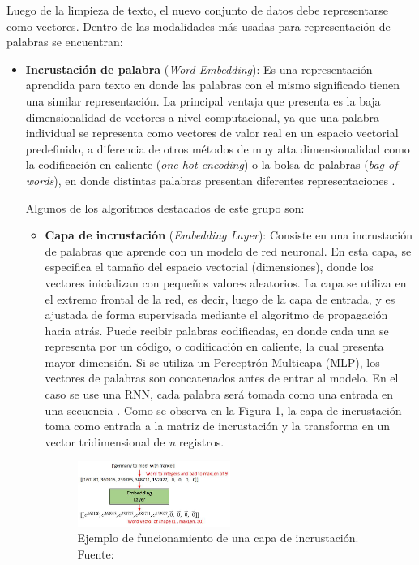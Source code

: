 Luego de la limpieza de texto, el nuevo conjunto de datos debe representarse como vectores. Dentro de las modalidades más usadas para representación de palabras se encuentran:
\begin{itemize}
	\item \textbf{Incrustación de palabra} (\textit{Word Embedding}): Es una representación aprendida para texto en donde las palabras con el mismo significado tienen una similar representación. La principal ventaja que presenta es la baja dimensionalidad de vectores a nivel computacional, ya que una palabra individual se representa como vectores de valor real en un espacio vectorial predefinido, a diferencia de otros métodos de muy alta dimensionalidad como la codificación en caliente (\textit{one hot encoding}) o la bolsa de palabras (\textit{bag-of-words}), en donde distintas palabras presentan diferentes representaciones \parencite{bk_brownlee2017deeplearning_nlp}.
	
	Algunos de los algoritmos destacados de este grupo son:
	\begin{itemize}
		\item \textbf{Capa de incrustación} (\textit{Embedding Layer}): Consiste en una incrustación de palabras que aprende con un modelo de red neuronal. En esta capa, se especifica el tamaño del espacio vectorial (dimensiones), donde los vectores inicializan con pequeños valores aleatorios. La capa se utiliza en el extremo frontal de la red, es decir, luego de la capa de entrada, y es ajustada de forma supervisada mediante el algoritmo de propagación hacia atrás. Puede recibir palabras codificadas, en donde cada una se representa por un código, o codificación en caliente, la cual presenta mayor dimensión. Si se utiliza un Perceptrón Multicapa (MLP), los vectores de palabras son concatenados antes de entrar al modelo. En el caso se use una RNN, cada palabra será tomada como una entrada en una secuencia \parencite{bk_brownlee2017deeplearning_nlp}. Como se observa en la Figura \ref{2:fig47}, la capa de incrustación toma como entrada a la matriz de incrustación y la transforma en un vector tridimensional de \textit{n} registros.
		
		\begin{figure}[!ht]
			\begin{center}
				\includegraphics[width=0.50\textwidth]{2/figures/embedding_layer.jpg}
				\caption[Ejemplo de funcionamiento de una capa de incrustación]{Ejemplo de funcionamiento de una capa de incrustación.\\
				Fuente: \cite{tec_chengwei2018embedding}}
				\label{2:fig47}
			\end{center}
		\end{figure}
		

\end{itemize}
\end{itemize}
